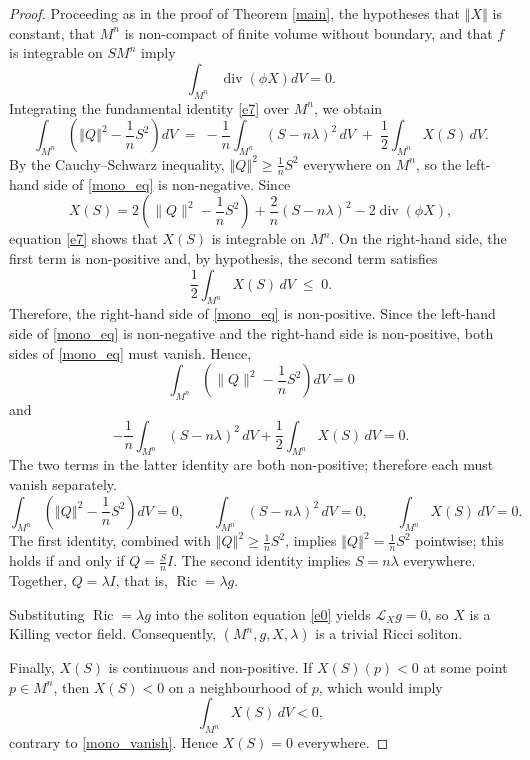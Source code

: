 \documentclass[a4paper, twoside, 10pt]{article}
\numberwithin{equation}{section}
\theoremstyle{definition}
\begin{document}
\begin{proof}
Proceeding as in the proof of Theorem \ref{main}, the hypotheses that
$\left\Vert X\right\Vert$ is constant, that $M^{n}$ is non-compact of
finite volume without boundary, and that $f$ is integrable on
$SM^{n}$ imply
\[
\int_{M^{n}}\operatorname{div}\left(\phi X\right)dV=0.
\]
Integrating the fundamental identity \eqref{e7} over $M^{n}$, we
obtain
\begin{equation}\label{mono_eq}
\int_{M^{n}}\!\left(\left\Vert Q\right\Vert ^{2}
-\frac{1}{n}S^{2}\right)dV
\;=\;
-\frac{1}{n}\int_{M^{n}}\!(S-n\lambda)^{2}\,dV
\;+\;\frac{1}{2}\int_{M^{n}}\!X(S)\,dV.
\end{equation}
By the Cauchy--Schwarz inequality,
$\left\Vert Q\right\Vert^{2}\geq\frac{1}{n}S^{2}$ everywhere on
$M^{n}$, so the left-hand side of \eqref{mono_eq} is non-negative. Since
\[
X(S)
=
2\left(\|Q\|^2-\frac1nS^2\right)
+\frac{2}{n}(S-n\lambda)^2
-2\operatorname{div}(\phi X),
\]
equation \eqref{e7} shows that \(X(S)\) is integrable on \(M^n\).
On the right-hand side, the first term is non-positive and, by
hypothesis, the second term satisfies
\[
\frac{1}{2}\int_{M^{n}}X(S)\,dV\;\leq\;0.
\]
Therefore, the right-hand side of \eqref{mono_eq} is non-positive.
Since the left-hand side of \eqref{mono_eq} is non-negative and the
right-hand side is non-positive, both sides of \eqref{mono_eq} must
vanish. Hence,
\[
\int_{M^n}\left(\|Q\|^2-\frac1nS^2\right)dV=0
\]
and
\[
-\frac1n\int_{M^n}(S-n\lambda)^2\,dV
+\frac12\int_{M^n}X(S)\,dV=0.
\]
The two terms in the latter identity are both non-positive;
therefore each must vanish separately.
\begin{equation}\label{mono_vanish}
\int_{M^{n}}\!\left(\left\Vert Q\right\Vert ^{2}
-\frac{1}{n}S^{2}\right)dV=0,\qquad
\int_{M^{n}}\!(S-n\lambda)^{2}\,dV=0,\qquad
\int_{M^{n}}\!X(S)\,dV=0.
\end{equation}
The first identity, combined with
$\left\Vert Q\right\Vert^{2}\geq\frac{1}{n}S^{2}$, implies
$\left\Vert Q\right\Vert^{2}=\frac{1}{n}S^{2}$ pointwise; this
holds if and only if $Q=\frac{S}{n}I$. The second identity implies
$S=n\lambda$ everywhere. Together, $Q=\lambda I$, that is,
$\operatorname{Ric}=\lambda g$.

Substituting $\operatorname{Ric}=\lambda g$ into the soliton equation
\eqref{e0} yields $\mathcal{L}_{X}g=0$, so $X$ is a Killing vector
field. Consequently, $\left( M^{n},g,X,\lambda \right)$ is a trivial
Ricci soliton.

Finally, \(X(S)\) is continuous and non-positive.
If \(X(S)(p)<0\) at some point \(p\in M^n\), then
\(X(S)<0\) on a neighbourhood of \(p\), which would imply
\[
\int_{M^n}X(S)\,dV<0,
\]
contrary to \eqref{mono_vanish}. Hence \(X(S)=0\) everywhere.
\end{proof}
\end{document}
